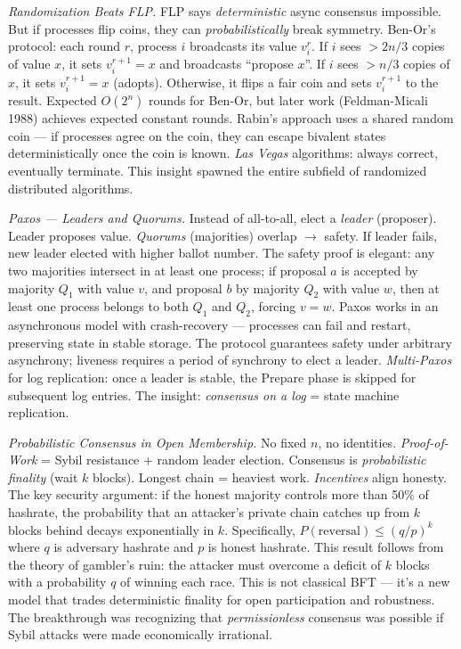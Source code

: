 \emph{Randomization Beats FLP.}
FLP says \emph{deterministic} async consensus impossible. But if processes flip coins, they can \emph{probabilistically} break symmetry. Ben-Or's protocol: each round $r$, process $i$ broadcasts its value $v_i^r$. If $i$ sees $> 2n/3$ copies of value $x$, it sets $v_i^{r+1} = x$ and broadcasts ``propose $x$''. If $i$ sees $> n/3$ copies of $x$, it sets $v_i^{r+1} = x$ (adopts). Otherwise, it flips a fair coin and sets $v_i^{r+1}$ to the result. Expected $O(2^n)$ rounds for Ben-Or, but later work (Feldman-Micali 1988) achieves expected constant rounds. Rabin's approach uses a shared random coin — if processes agree on the coin, they can escape bivalent states deterministically once the coin is known. \emph{Las Vegas} algorithms: always correct, eventually terminate. This insight spawned the entire subfield of randomized distributed algorithms.

\emph{Paxos — Leaders and Quorums.}
Instead of all-to-all, elect a \emph{leader} (proposer). Leader proposes value. \emph{Quorums} (majorities) overlap $\to$ safety. If leader fails, new leader elected with higher ballot number. The safety proof is elegant: any two majorities intersect in at least one process; if proposal $a$ is accepted by majority $Q_1$ with value $v$, and proposal $b$ by majority $Q_2$ with value $w$, then at least one process belongs to both $Q_1$ and $Q_2$, forcing $v = w$. Paxos works in an asynchronous model with crash-recovery — processes can fail and restart, preserving state in stable storage. The protocol guarantees safety under arbitrary asynchrony; liveness requires a period of synchrony to elect a leader. \emph{Multi-Paxos} for log replication: once a leader is stable, the Prepare phase is skipped for subsequent log entries. The insight: \emph{consensus on a log} = state machine replication.

\emph{Probabilistic Consensus in Open Membership.}
No fixed $n$, no identities. \emph{Proof-of-Work} = Sybil resistance + random leader election. Consensus is \emph{probabilistic finality} (wait $k$ blocks). Longest chain = heaviest work. \emph{Incentives} align honesty. The key security argument: if the honest majority controls more than 50\% of hashrate, the probability that an attacker's private chain catches up from $k$ blocks behind decays exponentially in $k$. Specifically, $P(\text{reversal}) \le (q/p)^k$ where $q$ is adversary hashrate and $p$ is honest hashrate. This result follows from the theory of gambler's ruin: the attacker must overcome a deficit of $k$ blocks with a probability $q$ of winning each race. This is not classical BFT — it's a new model that trades deterministic finality for open participation and robustness. The breakthrough was recognizing that \emph{permissionless} consensus was possible if Sybil attacks were made economically irrational.

